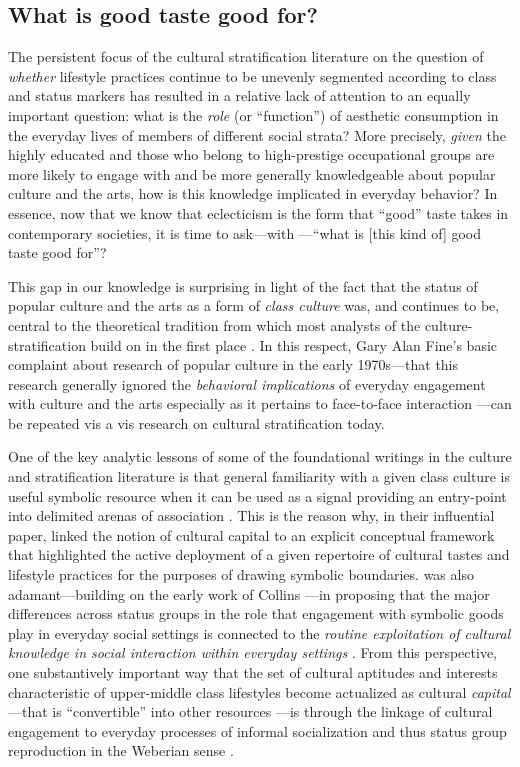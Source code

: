 \subsection{What is good taste good for?}
The persistent focus of the cultural stratification literature on the question of \emph{whether} lifestyle practices continue to be unevenly segmented according to class and status markers has resulted in a relative lack of attention to an equally important question:  what is the \emph{role} (or ``function'') of aesthetic consumption in the everyday lives of members of different social strata? More precisely, \emph{given} the highly educated and those who belong to high-prestige occupational groups are more likely to engage with and be more generally knowledgeable about popular culture and the arts, how is this knowledge implicated in everyday behavior?  In essence, now that we know that eclecticism is the form that ``good'' taste takes in contemporary societies, it is time to ask---with \citep{erickson91}---``what is [this kind of] good taste good for''?

This gap in our knowledge is surprising in light of the fact that the status of popular culture and the arts as a form of \emph{class culture} was, and continues to be, central to the theoretical tradition from which most analysts of the culture-stratification build on in the first place \citep{collins75, dimaggio87, douglas_isherwood96}.  In this respect, Gary Alan Fine's basic complaint about research of popular culture in the early 1970s---that this research generally ignored the \emph{behavioral implications} of everyday engagement with culture and the arts especially as it pertains to face-to-face interaction \citep[453]{fine77}---can be repeated vis a vis research on cultural stratification today.  

One of the key analytic lessons of some of the foundational writings in the culture and stratification literature is that general familiarity with a given class culture is useful symbolic resource when it can be used as a signal providing an entry-point into delimited arenas of association \citep{mohr_dimaggio95}.  This is the reason why, in their influential paper, \citet{lamont_lareau88} linked the notion of cultural capital to an explicit conceptual framework that highlighted the active deployment of a given repertoire of cultural tastes and lifestyle practices for the purposes of drawing symbolic boundaries.  \citet{dimaggio87} was also adamant---building on the early work of Collins \citeyearpar{collins75}---in proposing that the major differences across status groups in the role that engagement with symbolic goods play in everyday social settings is connected to the \emph{routine exploitation of cultural knowledge in social interaction within everyday settings} \citep{erickson96, lizardo06a}. From this perspective, one substantively important way that the set of cultural aptitudes and interests characteristic of upper-middle class lifestyles become actualized as cultural \emph{capital}---that is ``convertible'' into other resources \citep{bourdieu86}---is through the linkage of cultural engagement to everyday processes of informal socialization and thus status group reproduction in the Weberian sense \citep{dimaggio_mohr85}.


